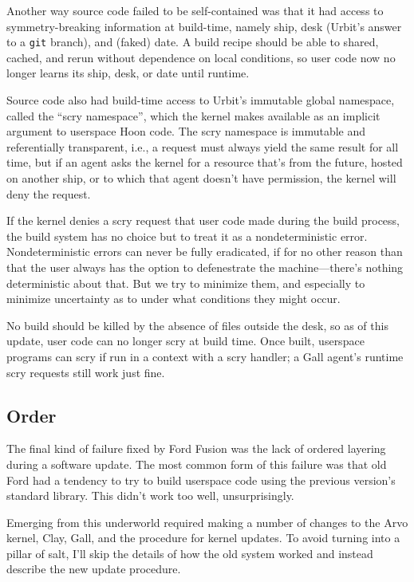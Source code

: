 \documentclass[twoside]{article}
\begin{document}
Another way source code failed to be self-contained was that it had access to symmetry-breaking information at build-time, namely ship, desk (Urbit's answer to a \texttt{git} branch), and (faked) date. A build recipe should be able to shared, cached, and rerun without dependence on local conditions, so user code now no longer learns its ship, desk, or date until runtime.

Source code also had build-time access to Urbit's immutable global namespace, called the “scry namespace”, which the kernel makes available as an implicit argument to userspace Hoon code. The scry namespace is immutable and referentially transparent, i.e., a request must always yield the same result for all time, but if an agent asks the kernel for a resource that’s from the future, hosted on another ship, or to which that agent doesn’t have permission, the kernel will deny the request.

If the kernel denies a scry request that user code made during the build process, the build system has no choice but to treat it as a nondeterministic error. Nondeterministic errors can never be fully eradicated, if for no other reason than that the user always has the option to defenestrate the machine—there's nothing deterministic about that. But we try to minimize them, and especially to minimize uncertainty as to under what conditions they might occur.

No build should be killed by the absence of files outside the desk, so as of this update, user code can no longer scry at build time. Once built, userspace programs can scry if run in a context with a scry handler; a Gall agent's runtime scry requests still work just fine.

\subsection{Order}

The final kind of failure fixed by Ford Fusion was the lack of ordered layering during a software update. The most common form of this failure was that old Ford had a tendency to try to build userspace code using the previous version's standard library. This didn't work too well, unsurprisingly.

Emerging from this underworld required making a number of changes to the Arvo kernel, Clay, Gall, and the procedure for kernel updates. To avoid turning into a pillar of salt, I'll skip the details of how the old system worked and instead describe the new update procedure.
\end{document}
